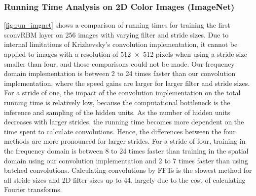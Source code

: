 \subsubsection[Running time analysis on 2D color images (ImageNet)]{Running Time
Analysis on 2D Color Images (ImageNet)}

\ref{fig:run_imgnet} shows a comparison of running
times for training the first sconvRBM layer on 256 images with varying filter
and stride sizes. Due to internal limitations of Krizhevsky's convolution
implementation, it cannot be applied to images with a resolution of
\num{512x512} pixels when using a stride size smaller than four, and those
comparisons could not be made. Our frequency domain implementation is between 2
to 24 times faster than our convolution implementation, where the speed gains
are larger for larger filter and stride sizes. For a stride of one, the impact
of the convolution implementation on the total running time is relatively low,
because the computational bottleneck is the inference and sampling of the hidden
units.
As the number of hidden units decreases with larger strides, the running time
becomes more dependent on the time spent to calculate convolutions.
Hence, the differences between the four methods are more pronounced for larger
strides. For a stride of four, training in the frequency domain is between 8 to
24 times faster than training in the spatial domain using our convolution
implementation and 2 to 7 times faster than using batched convolutions.
Calculating convolutions by FFTs is the slowest method for all stride sizes and
2D filter sizes up to 44, largely due to the cost of calculating Fourier
transforms.

